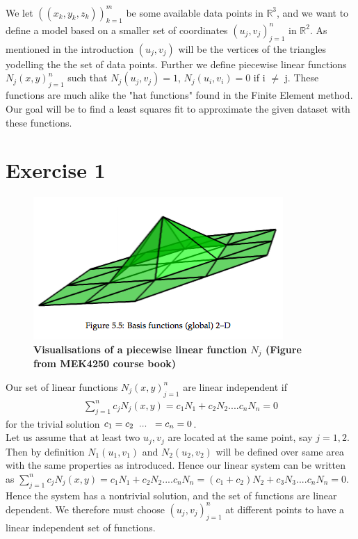 \documentclass[a4paper,norsk]{article}
\begin{document}
\maketitle
We let $((x_k, y_k, z_k))_{k=1}^m$ be some available data points in $\mathbb{R}^3$, and we want to define a model based on a smaller set of 
coordinates ${(u_j, v_j)}_{j=1}^n$ in $\mathbb{R}^2$. As mentioned in the introduction $(u_j, v_j)$ will be the vertices of the triangles yodelling the the set of
data points. Further we define piecewise linear functions ${N_j(x, y)}_{j=1}^n$ such that $N_j(u_j, v_j) = 1$, $N_j(u_i, v_i) = 0$ if i $\neq$ j. These functions are much alike the "hat functions" found in the Finite Element method. Our goal will be to find a least squares fit to approximate the given dataset with these functions.

\section*{Exercise 1}
\begin{figure}[h!]
	\centering
	\caption*{\textbf{Visualisations of a piecewise linear function $N_j$ \newline (Figure from MEK4250 course book)}}
	\includegraphics[scale=0.36]{element.png}
\end{figure}

Our set of linear functions ${N_j(x, y)}_{j=1}^n$ are linear independent if \begin{align*}
\sum_{j=1}^n c_j N_j(x,y) = c_1 N_1 + c_2 N_2 .... c_n N_n = 0 
\end{align*}
for the trivial solution $c_1 = c_2 \hspace{2mm}... \hspace{2mm} = c_n = 0$. 
\\Let us assume that at least two ${u_j, v_j}$ are located at the same point, say $j = 1,2$. Then by definition $N_1(u_1, v_1)$ and $N_2(u_2, v_2)$ will be defined over same area with the same properties as introduced. Hence our linear system can be written as 
$\sum_{j=1}^n c_j N_j(x,y) = c_1 N_1 + c_2 N_2 .... c_n N_n = (c_1 + c_2)N_2 + c_3 N_3 .... c_n N_n = 0$. Hence the system has a nontrivial solution, and the set of functions are linear dependent. We therefore must
choose ${(u_j, v_j)}_{j=1}^n$ at different points to have a linear independent set of functions. 
\end{document}
